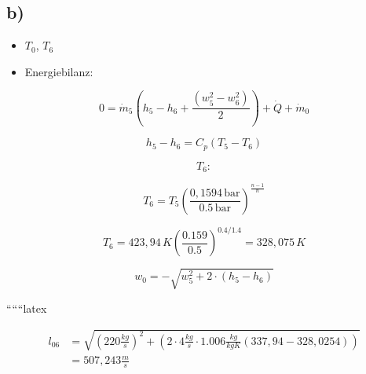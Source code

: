 

\subsection*{b)}

\begin{itemize}
    \item $T_0$, $T_6$
    \item Energiebilanz:
\end{itemize}

\[
0 = \dot{m}_5 (h_5 - h_6 + \frac{(w_5^2 - w_6^2)}{2}) + \dot{Q} + \dot{m}_0
\]

\[
h_5 - h_6 = C_p (T_5 - T_6)
\]

\[
T_6:
\]

\[
T_6 = T_5 \left( \frac{0,1594 \, \text{bar}}{0.5 \, \text{bar}} \right)^{\frac{n-1}{n}}
\]

\[
T_6 = 423,94 \, K \left( \frac{0.159}{0.5} \right)^{0.4/1.4} = 328,075 \, K
\]

\[
w_0 = -\sqrt{w_5^2 + 2 \cdot (h_5 - h_6)}
\]

``````latex


\[
\begin{aligned}
    l_{06} &= \sqrt{(220 \frac{kg}{s})^2 + (2 \cdot 4 \frac{kg}{s} \cdot 1.006 \frac{kg}{kgK} (337,94 - 328,0254))} \\
    &= 507,243 \frac{m}{s}
\end{aligned}
\]